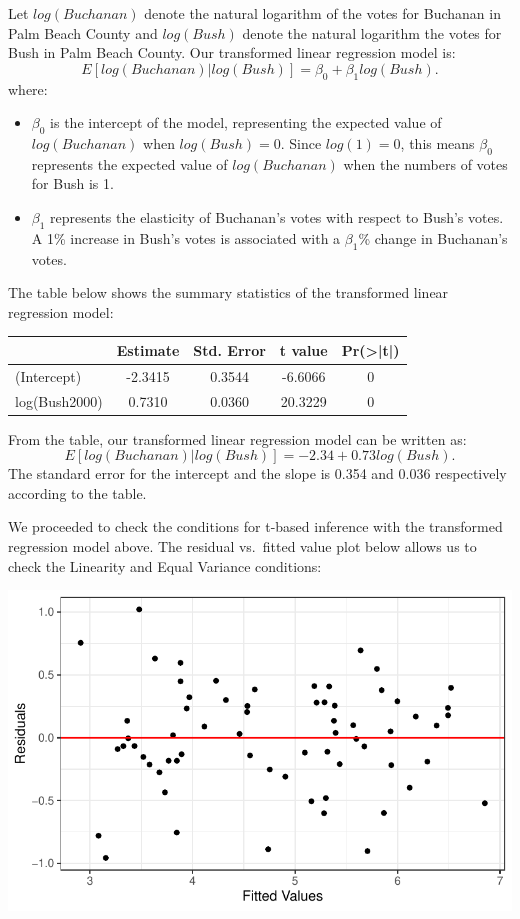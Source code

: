 \documentclass[
  letterpaper,
  DIV=11,
  numbers=noendperiod]{scrartcl}
\begin{document}
Let \(log(Buchanan)\) denote the natural logarithm of the votes for
Buchanan in Palm Beach County and \(log(Bush)\) denote the natural
logarithm the votes for Bush in Palm Beach County. Our transformed
linear regression model is:
\[E[log(Buchanan) | log(Bush)] = \beta_0 + \beta_1log(Bush).\]where:

\begin{itemize}
\item
  \(\beta_0\) is the intercept of the model, representing the expected
  value of \(log(Buchanan)\) when \(log(Bush) = 0\). Since
  \(log(1) = 0\), this means \(\beta_0\) represents the expected value
  of \(log(Buchanan)\) when the numbers of votes for Bush is 1.
\item
  \(\beta_1\) represents the elasticity of Buchanan's votes with respect
  to Bush's votes. A 1\% increase in Bush's votes is associated with a
  \(\beta_1\)\% change in Buchanan's votes.
\end{itemize}

The table below shows the summary statistics of the transformed linear
regression model:

\begin{table}[H]
\centering
\begin{tabular}[t]{lcccc}
\toprule
  & Estimate & Std. Error & t value & Pr(>|t|)\\
\midrule
(Intercept) & -2.3415 & 0.3544 & -6.6066 & 0\\
log(Bush2000) & 0.7310 & 0.0360 & 20.3229 & 0\\
\bottomrule
\end{tabular}
\end{table}

From the table, our transformed linear regression model can be written
as: \[E[log(Buchanan) | log(Bush)] = -2.34 + 0.73log(Bush).\] The
standard error for the intercept and the slope is 0.354 and 0.036
respectively according to the table.

We proceeded to check the conditions for t-based inference with the
transformed regression model above. The residual vs.~fitted value plot
below allows us to check the Linearity and Equal Variance conditions:

\includegraphics{SDS-291-case-study-1_files/figure-pdf/unnamed-chunk-8-1.pdf}
\end{document}
